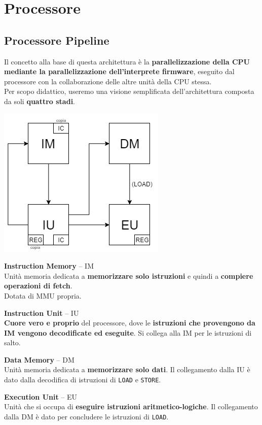 \documentclass[10pt]{report}
\begin{document}
\section{Processore}
\subsection{Processore Pipeline}
Il concetto alla base di questa architettura è la \textbf{parallelizzazione della CPU mediante la parallelizzazione dell'interprete firmware}, eseguito dal processore con la collaborazione delle altre unità della CPU stessa.\\
Per scopo didattico, useremo una visione semplificata dell'architettura composta da soli \textbf{quattro stadi}.
\begin{center}
\includegraphics[scale=1]{procpipeline.png}
\end{center}
\begin{list}{}{}
	\item \textbf{Instruction Memory} -- IM\\
	Unità memoria dedicata a \textbf{memorizzare solo istruzioni} e quindi a \textbf{compiere operazioni di fetch}.\\
	Dotata di MMU propria.
	\item \textbf{Instruction Unit} -- IU\\
	\textbf{Cuore vero e proprio} del processore, dove le \textbf{istruzioni che provengono da IM vengono decodificate ed eseguite}. Si collega alla IM per le istruzioni di salto.
	\item \textbf{Data Memory} -- DM\\
	Unità memoria dedicata a \textbf{memorizzare solo dati}. Il collegamento dalla IU è dato dalla decodifica di istruzioni di \texttt{LOAD} e \texttt{STORE}.
	\item \textbf{Execution Unit} -- EU\\
	Unità che si occupa di \textbf{eseguire istruzioni aritmetico-logiche}. Il collegamento dalla DM è dato per concludere le istruzioni di \texttt{LOAD}.
\end{list}
\end{document}

